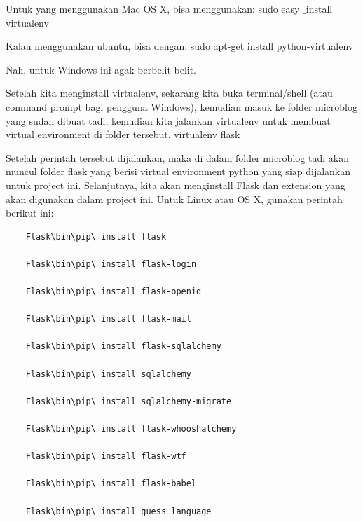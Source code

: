 {{{{\noindent
{\fontsize{14pt}{14pt}\selectfont Untuk yang menggunakan Mac OS X, bisa menggunakan:\vspace{\baselineskip}
sudo easy $  \_  $install virtualenv \\} \par
\noindent
{\fontsize{14pt}{14pt}\selectfont Kalau menggunakan ubuntu, bisa dengan:\vspace{\baselineskip}
sudo apt-get install python-virtualenv \\} \par
\noindent
{\fontsize{14pt}{14pt}\selectfont Nah, untuk Windows ini agak berbelit-belit. \\} \par
\noindent
{\fontsize{14pt}{14pt}\selectfont Setelah kita menginstall virtualenv, sekarang kita buka terminal/shell (atau command prompt bagi pengguna Windows), kemudian masuk ke folder microblog yang sudah dibuat tadi, kemudian kita jalankan virtualenv untuk membuat virtual environment di folder tersebut.\vspace{\baselineskip}
virtualenv flask \\} \par
\noindent
{\fontsize{14pt}{14pt}\selectfont Setelah perintah tersebut dijalankan, maka di dalam folder microblog tadi akan muncul folder flask yang berisi virtual environment python yang siap dijalankan untuk project ini. Selanjutnya, kita akan menginstall Flask dan extension yang akan digunakan dalam project ini. Untuk Linux atau OS X, gunakan perintah berikut ini: \\} \par

\begin{verbatim}
	Flask\bin\pip\ install flask
	
	Flask\bin\pip\ install flask-login
	
	Flask\bin\pip\ install flask-openid
	
	Flask\bin\pip\ install flask-mail
	
	Flask\bin\pip\ install flask-sqlalchemy
	
	Flask\bin\pip\ install sqlalchemy
	
	Flask\bin\pip\ install sqlalchemy-migrate
	
	Flask\bin\pip\ install flask-whooshalchemy
	
	Flask\bin\pip\ install flask-wtf
	
	Flask\bin\pip\ install flask-babel
	
	Flask\bin\pip\ install guess_language
	

\end{verbatim}}}}}
